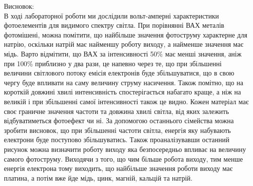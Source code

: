 \documentclass[a4paper,14pt]{extreport}
\begin{document}
\clearpage
\newpage
Висновок:\\
В ході лабораторної роботи ми дослідили вольт-амперні характеристики 
фотоелементів для видимого спектру світла.  
При порівнянні ВАХ металів
фотомішені, можна помітити, що найбільше значення фотоструму
характерне для натрію, оскільки натрій має найменшу роботу виходу, а найменше значення має мідь. 
Варто відмітити, що ВАХ за інтенсивності 50\% має менші 
значення, аніж при 100\% приблизно у два рази, це напевно через те, 
що при збільшенні величини світлового потоку емісія електронів буде збільшуватися, що в свою чергу буде впливати на саму величину струму насичення. 
Також помітно, що на короткій довжині хвилі интенсивність спостерігається набагато краще, а ніж на великій і при збільшенні самої інтенсивності також це видно. 
Кожен матеріал має своє граничне значення частоти та довжина хвилі світла, від яких залежить відбуватиметься фотоефект чи ні. 
За допомогою останнього сімейства можна зробити висновок, що при збільшенні частоти світла, енергія яку набувають електрони буде поступово збільшуватись. Також проаналізувавши останний рисунок можна визначити роботу виходу яка безпосередньо впливає на величину самого фотоструму. 
Виходячи з того, що  чим більше робота виходу, тим менше енергія електрона тому виходить, що  найбільше значення роботи виходу має платина, а потім вже йде мідь, цинк, магній, кальцій та натрій.
\end{document}
